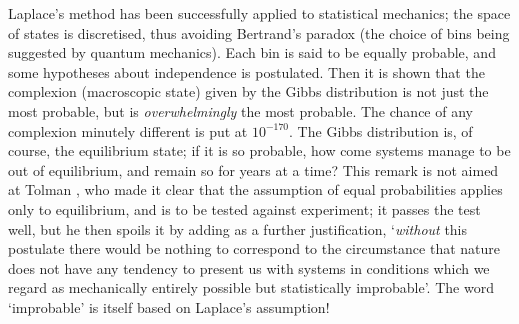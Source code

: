 Laplace's method has been
successfully applied to statistical mechanics; the space of states is
discretised, thus avoiding Bertrand's paradox (the choice of
bins being suggested by quantum mechanics). Each bin is said to be
equally probable, and some hypotheses about independence is postulated.
Then it is shown that the complexion (macroscopic state) given by the
Gibbs distribution is not just the most probable, but is {\em
overwhelmingly} the most probable. The chance of any complexion minutely
different is put at $10^{-170}$. The Gibbs distribution is, of course,
the equilibrium state; if it is so probable, how come systems manage to
be out of equilibrium, and remain so for years at a time? This remark
is not aimed at Tolman \cite{Tolman}, who made it clear that the assumption
of equal probabilities applies only to equilibrium, and is to be tested
against experiment; it passes the test well, but he then spoils it by adding
as a further justification, `{\em without} this
postulate there would be nothing to correspond to the circumstance that
nature does not have any tendency to present us with systems in conditions 
which we regard as mechanically entirely possible but statistically
improbable'. The word `improbable' is itself based on Laplace's
assumption!

